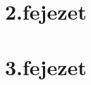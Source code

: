\documentclass[tocnopagenum]{thesis-ekf}
\theoremstyle{definition}
\theoremstyle{remark}
\begin{document}

	\chapter*{2.fejezet}

	\chapter*{3.fejezet}

\end{document}
